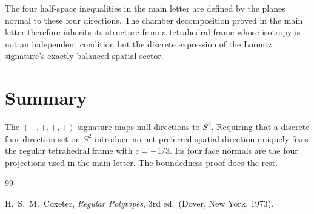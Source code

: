 \documentclass[twocolumn]{iopjournal}
\begin{document}
The four half-space inequalities in the main letter are defined by the planes normal to these four directions. The chamber decomposition proved in the main letter therefore inherits its structure from a tetrahedral frame whose isotropy is not an independent condition but the discrete expression of the Lorentz signature's exactly balanced spatial sector.


\section*{Summary}

The $(-,+,+,+)$ signature maps null directions to $S^2$. Requiring that a discrete four-direction set on $S^2$ introduce no net preferred spatial direction uniquely fixes the regular tetrahedral frame with $c = -1/3$. Its four face normals are the four projections used in the main letter. The boundedness proof does the rest.


\begin{thebibliography}{99}

H.~S.~M.~Coxeter,
\textit{Regular Polytopes},
3rd ed.\ (Dover, New York, 1973).

\end{thebibliography}
\end{document}
